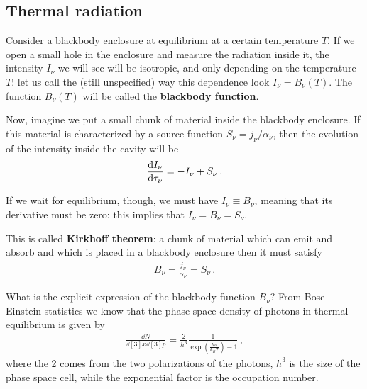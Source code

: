 \documentclass[main.tex]{subfiles}
\begin{document}
\subsection{Thermal radiation}


Consider a blackbody enclosure at equilibrium at a certain temperature \(T\). If we open a small hole in the enclosure and measure the radiation inside it, the intensity \(I_\nu \) we will see will be isotropic, and only depending on the temperature \(T\): let us call the (still unspecified) way this dependence look \(I_\nu = B_\nu (T)\). The function \(B_\nu (T)\) will be called the \textbf{blackbody function}. 

Now, imagine we put a small chunk of material inside the blackbody enclosure. If this material is characterized by a source function \(S_\nu = j_\nu / \alpha_{\nu }\), then the evolution of the intensity inside the cavity will be 
%
\begin{align}
\dv{I_\nu }{\tau_{\nu }} = - I_\nu + S_\nu 
\,.
\end{align}

If we wait for equilibrium, though, we must have \(I_\nu \equiv B_\nu \), meaning that its derivative must be zero: this implies that \(I_\nu = B_\nu = S_\nu \). 

This is called \textbf{Kirkhoff theorem}: a chunk of material which can emit and absorb and which is placed in a blackbody enclosure then it must satisfy 
%
\begin{align}
B_\nu = \frac{j_\nu}{\alpha_{\nu }} = S_\nu 
\,.
\end{align}

What is the explicit expression of the blackbody function \(B_\nu \)? 
From Bose-Einstein statistics we know that the phase space density of photons in thermal equilibrium is given by 
%
\begin{align}
\frac{ \dd{N}}{ \dd[3]{x} \dd[3]{p}} = \frac{2}{h^3} \frac{1}{\exp( \frac{h \nu }{k_B T}) - 1}
\,,
\end{align}
%
where the 2 comes from the two polarizations of the photons, \(h^3\) is the size of the phase space cell, while the exponential factor is the occupation number. 

\end{document}
